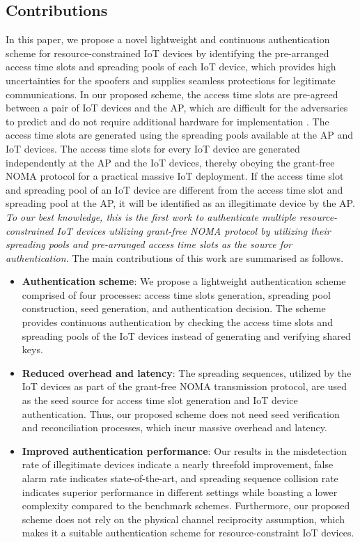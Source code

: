 \documentclass[journal,10pt]{IEEEtran}
\begin{document}
\subsection{Contributions}
In this paper, we propose a novel lightweight and continuous authentication scheme for resource-constrained IoT devices by identifying the pre-arranged access time slots and spreading pools of each IoT device, which provides high uncertainties for the spoofers and supplies seamless protections for legitimate communications. In our proposed scheme, the access time slots are pre-agreed between a pair of IoT devices and the AP, which are difficult for the adversaries to predict and do not require additional hardware for implementation \cite{9378574}. The access time slots are generated using the spreading pools available at the AP and IoT devices. The access time slots for every IoT device are generated independently at the AP and the IoT devices, thereby obeying the grant-free NOMA protocol for a practical massive IoT deployment. If the access time slot and spreading pool of an IoT device are different from the access time slot and spreading pool at the AP, it will be identified as an illegitimate device by the AP.  \textit{To our best knowledge, this is the first work to authenticate multiple resource-constrained IoT devices utilizing grant-free NOMA protocol by utilizing their spreading pools and pre-arranged access time slots as the source for authentication.} The main contributions of this work are summarised as follows.

\begin{itemize}
    \item \textbf{Authentication scheme}: We propose a lightweight authentication scheme comprised of four processes: access time slots generation, spreading pool construction, seed generation, and authentication decision. The scheme provides continuous authentication by checking the access time slots and spreading pools of the IoT devices instead of generating and verifying shared keys.
    
    \item \textbf{Reduced overhead and latency}: The spreading sequences, utilized by the IoT devices as part of the grant-free NOMA transmission protocol, are used as the seed source for access time slot generation and IoT device authentication. Thus, our proposed scheme does not need seed verification and reconciliation processes, which incur massive overhead and latency.
    
    \item \textbf{Improved authentication performance}: Our results in the misdetection rate of illegitimate devices indicate a nearly threefold improvement, false alarm rate indicates state-of-the-art, and spreading sequence collision rate indicates superior performance in different settings while boasting a lower complexity compared to the benchmark schemes. Furthermore, our proposed scheme does not rely on the physical channel reciprocity assumption, which makes it a suitable authentication scheme for resource-constraint IoT devices.  
\end{itemize}
\end{document}
